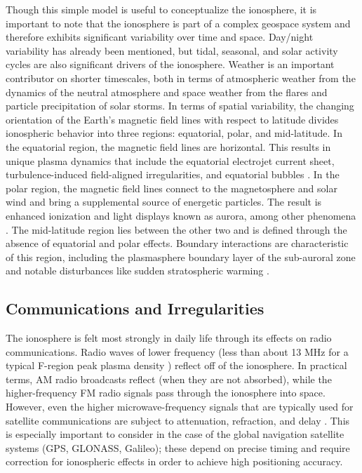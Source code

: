 Though this simple model is useful to conceptualize the ionosphere, it is important to note that the ionosphere is part of a complex geospace system and therefore exhibits significant variability over time and space. Day/night variability has already been mentioned, but tidal, seasonal, and solar activity cycles are also significant drivers of the ionosphere. Weather is an important contributor on shorter timescales, both in terms of atmospheric weather from the dynamics of the neutral atmosphere and space weather from the flares and particle precipitation of solar storms. In terms of spatial variability, the changing orientation of the Earth's magnetic field lines with respect to latitude divides ionospheric behavior into three regions: equatorial, polar, and mid-latitude. In the equatorial region, the magnetic field lines are horizontal. This results in unique plasma dynamics that include the equatorial electrojet current sheet, turbulence-induced field-aligned irregularities, and equatorial bubbles \autocite{Kel09}. In the polar region, the magnetic field lines connect to the magnetosphere and solar wind and bring a supplemental source of energetic particles. The result is enhanced ionization and light displays known as aurora, among other phenomena \autocite{KR95}. The mid-latitude region lies between the other two and is defined through the absence of equatorial and polar effects. Boundary interactions are characteristic of this region, including the plasmasphere boundary layer of the sub-auroral zone \autocite{CL04} and notable disturbances like sudden stratospheric warming \autocite{GHB+13}.

\subsection{Communications and Irregularities}
\label{intro_communications}
The ionosphere is felt most strongly in daily life through its effects on radio communications. Radio waves of lower frequency (less than about 13 MHz for a typical F-region peak plasma density \autocite{Tas10}) reflect off of the ionosphere. In practical terms, AM radio broadcasts reflect (when they are not absorbed), while the higher-frequency FM radio signals pass through the ionosphere into space. However, even the higher microwave-frequency signals that are typically used for satellite communications are subject to attenuation, refraction, and delay \autocite{Kel09}. This is especially important to consider in the case of the global navigation satellite systems (GPS, GLONASS, Galileo); these depend on precise timing and require correction for ionospheric effects in order to achieve high positioning accuracy.


